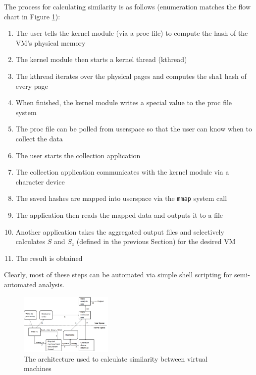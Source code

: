 \documentclass{acm_proc_article-sp}
\begin{document}
The process for calculating similarity is as follows (enumeration matches the flow chart in Figure \ref{fig:flow}):
\begin{enumerate}
  \item The user tells the kernel module (via a proc file)  to compute the hash of the VM's physical memory
  \item The kernel module then starts a kernel thread (kthread)
  \item The kthread iterates over the physical pages and computes the sha1 hash of every page
  \item When finished, the kernel module writes a special value to the proc file system
  \item The proc file can be polled from userspace so that the user can know when to collect the data
  \item The user starts the collection application
  \item The collection application communicates with the kernel module via a character device
  \item The saved hashes are mapped into userspace via the {\tt mmap} system call
  \item The application then reads the mapped data and outputs it to a file
  \item Another application takes the aggregated output files and selectively calculates $S$ and $S_z$ (defined in the previous Section) for the desired VM
  \item The result is obtained
\end{enumerate}
Clearly, most of these steps can be automated via simple shell scripting for semi-automated analysis.

\begin{figure}
  \centering
  \includegraphics[width=0.4\textwidth]{images/architecture.png}
  \caption{The architecture used to calculate similarity between virtual machines}\label{fig:flow}
\end{figure}
\end{document}
